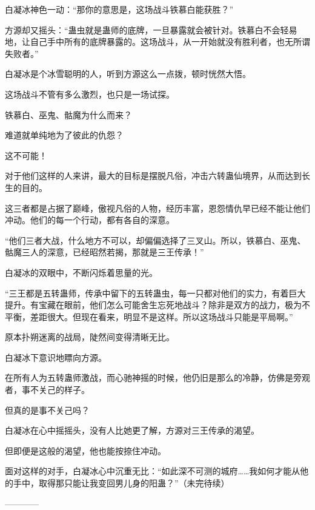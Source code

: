 \begin{this_body}
白凝冰神色一动：“那你的意思是，这场战斗铁慕白能获胜？”

方源却又摇头：“蛊虫就是蛊师的底牌，一旦暴露就会被针对。铁慕白不会轻易地，让自己手中所有的底牌暴露的。这场战斗，从一开始就没有胜利者，也无所谓失败者。”

白凝冰是个冰雪聪明的人，听到方源这么一点拨，顿时恍然大悟。

这场战斗不管有多么激烈，也只是一场试探。

铁慕白、巫鬼、骷魔为什么而来？

难道就单纯地为了彼此的仇怨？

这不可能！

对于他们这样的人来讲，最大的目标是摆脱凡俗，冲击六转蛊仙境界，从而达到长生的目的。

这三者都是占据了巅峰，傲视凡俗的人物，经历丰富，恩怨情仇早已经不能让他们冲动。他们的每一个行动，都有各自的深意。

“他们三者大战，什么地方不可以，却偏偏选择了三叉山。所以，铁慕白、巫鬼、骷魔三人的深意，已经昭然若揭，那就是三王传承！”

白凝冰的双眼中，不断闪烁着思量的光。

“三王都是五转蛊师，传承中留下的五转蛊虫，每一只都对他们的实力，有着巨大提升。有宝藏在眼前，他们怎么可能舍生忘死地战斗？除非是双方的战力，极为不平衡，差距很大。但现在看来，明显不是这样。所以这场战斗只能是平局啊。”

原本扑朔迷离的战局，陡然间变得清晰无比。

白凝冰下意识地瞟向方源。

在所有人为五转蛊师激战，而心驰神摇的时候，他仍旧是那么的冷静，仿佛是旁观者，事不关己的样子。

但真的是事不关己吗？

白凝冰在心中摇摇头，没有人比她更了解，方源对三王传承的渴望。

但即便是这般的渴望，他也能按捺住冲动。

面对这样的对手，白凝冰心中沉重无比：“如此深不可测的城府……我如何才能从他的手中，取得那只能让我变回男儿身的阳蛊？”（未完待续）

------------

\end{this_body}

